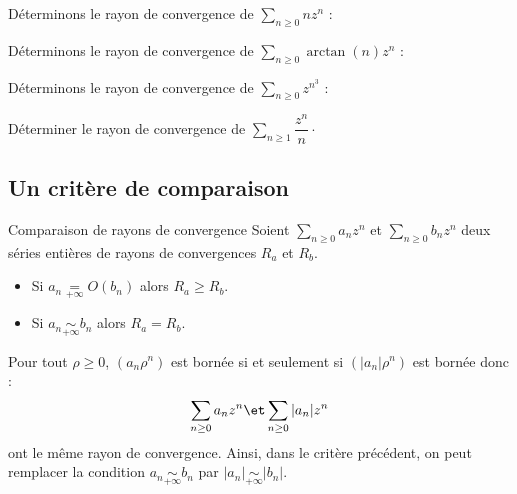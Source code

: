 \documentclass[french,11pt,twoside]{VcCours}
\begin{document}
\begin{Exemple}{} Déterminons le rayon de convergence de $\sum_{n \geq 0} n z^n$ :

\vspace*{ 4cm}
\end{Exemple}

\begin{Exemple}{} Déterminons le rayon de convergence de $\sum_{n \geq 0} \arctan(n) z^n$ :

\vspace*{ 4cm}
\end{Exemple}

\newpage
\begin{Exemple}{} Déterminons le rayon de convergence de $\sum_{n \geq 0} z^{n^3}$ :

\vspace*{ 4cm}
\end{Exemple}

\begin{ApplicationDirecte}{} Déterminer le rayon de convergence de $\sum_{n \geq 1} \dfrac{z^n}{n} \cdot$
\end{ApplicationDirecte}
\subsection{Un critère de comparaison}

\begin{Proposition}{Comparaison de rayons de convergence}
Soient $\sum_{n \geq 0} a_n z^n$ et $\sum_{n \geq 0} b_n z^n$ deux séries entières de rayons de convergences $R_a$ et $R_b$. 
\begin{itemize}
\item Si $a_n \underset{+ \infty}{=} O(b_n)$ alors $R_a \geq R_b$.
\item Si $a_n \underset{+ \infty}{\sim} b_n$ alors $R_a = R_b$.
\end{itemize}
\end{Proposition}

\begin{Demonstration}{}
\vspace*{ 5cm}
\end{Demonstration}

\begin{Remarque}{} Pour tout $\rho \geq 0$, $(a_n \rho^n)$ est bornée si et seulement si $(\vert a_n \vert \rho^n)$ est bornée donc :
$$ \sum_{n \geq 0} a_n z^n \et \sum_{n \geq 0} \vert a_n \vert z^n$$
ont le même rayon de convergence. Ainsi, dans le critère précédent, on peut remplacer la condition $a_n \underset{+ \infty}{\sim} b_n$ par $\vert a_n \vert \underset{+ \infty}{\sim} \vert b_n \vert$.
\end{Remarque}
\end{document}
